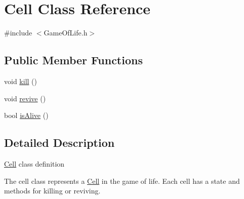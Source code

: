 \hypertarget{class_cell}{
\section{Cell Class Reference}
\label{class_cell}
}


{\ttfamily \#include $<$GameOfLife.h$>$}

\subsection*{Public Member Functions}
\begin{DoxyCompactItemize}
\item 
void \hyperlink{class_cell_a956d5e8a4aa356fbb4dcfb0e11903836}{kill} ()
\item 
void \hyperlink{class_cell_a908130b21a8c6f6b2397d59b83fd5d9b}{revive} ()
\item 
bool \hyperlink{class_cell_a6c8a8a5b7fcc15c9ccea420e35374194}{isAlive} ()
\end{DoxyCompactItemize}


\subsection{Detailed Description}
\hyperlink{class_cell}{Cell} class definition

The cell class represents a \hyperlink{class_cell}{Cell} in the game of life. Each cell has a state and methods for killing or reviving. 

